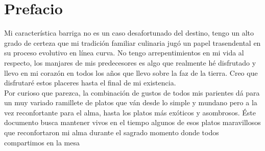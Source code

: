 \chapter{Prefacio}
Mi característica barriga no es un caso desafortunado del destino, tengo un alto grado de certeza que mi tradición familiar culinaria jugó un papel trasendental en su proceso evolutivo en línea curva. No tengo arrepentimientos en mi vida al respecto, los manjares de mis predecesores es algo que realmente hé disfrutado y llevo en mi corazón en todos los años que llevo sobre la faz de la tierra. Creo que disfrutaré estos placeres hasta el final de mi existencia.\\

Por curioso que parezca, la combinación de gustos de todos mis parientes dá para un muy variado ramillete de platos que ván desde lo simple y mundano pero a la vez reconfortante para el alma, hasta los platos más exóticos y asombrosos. Éste documento busca mantener vivos en el tiempo algunos de esos platos maravillosos que reconfortaron mi alma durante el sagrado momento donde todos compartimos en la mesa \textellipsis